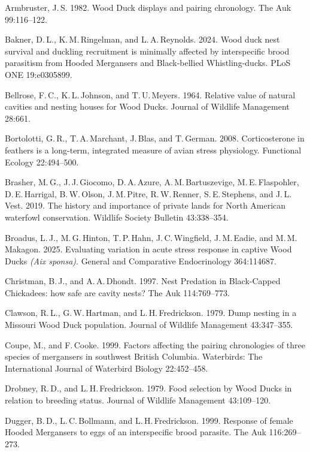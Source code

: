 
\begin{hangparas}{2em}{1}
	
	Armbruster, J.\,S. 1982. Wood Duck displays and pairing chronology. The Auk 99:116–122. 
	
	Bakner, D.\,L., K.\,M.\,Ringelman, and L.\,A.\,Reynolds. 2024. Wood duck nest survival and duckling recruitment is minimally affected by interspecific brood parasitism from Hooded Mergansers and Black-bellied Whistling-ducks. PLoS ONE 19:e0305899. 
	
	Bellrose, F.\,C., K.\,L.\,Johnson, and T.\,U.\,Meyers. 1964. Relative value of natural cavities and nesting houses for Wood Ducks. Journal of Wildlife Management 28:661. 
	
	Bortolotti, G.\,R., T.\,A.\,Marchant, J.\,Blas, and T.\,German. 2008. Corticosterone in feathers is a long-term, integrated measure of avian stress physiology. Functional Ecology 22:494–500. 
	
	Brasher, M.\,G., J.\,J.\,Giocomo, D.\,A.\,Azure, A.\,M.\,Bartuszevige, M.\,E.\,Flaspohler, D.\,E.\,Harrigal, B.\,W.\,Olson, J.\,M.\,Pitre, R.\,W.\,Renner, S.\,E.\,Stephens, and J.\,L.\,Vest. 2019. The history and importance of private lands for North American waterfowl conservation. Wildlife Society Bulletin 43:338–354. 
	
	Broadus, L.\,J., M.\,G.\,Hinton, T.\,P.\,Hahn, J.\,C.\,Wingfield, J.\,M.\,Eadie, and M.\,M.\,Makagon. 2025. Evaluating variation in acute stress response in captive Wood Ducks \textit{(Aix sponsa)}. General and Comparative Endocrinology 364:114687. 
	
	Christman, B.\,J., and A.\,A.\,Dhondt. 1997. Nest Predation in Black-Capped Chickadees: how safe are cavity nests? The Auk 114:769–773. 
	
	Clawson, R.\,L., G.\,W.\,Hartman, and L.\,H.\,Fredrickson. 1979. Dump nesting in a Missouri Wood Duck population. Journal of Wildlife Management 43:347–355. 
	
	Coupe, M., and F.\,Cooke. 1999. Factors affecting the pairing chronologies of three species of mergansers in southwest British Columbia. Waterbirds: The International Journal of Waterbird Biology 22:452–458. 
	
	Drobney, R.\,D., and L.\,H.\,Fredrickson. 1979. Food selection by Wood Ducks in relation to breeding status. Journal of Wildlife Management 43:109–120. 
	
	Dugger, B.\,D., L.\,C.\,Bollmann, and L.\,H.\,Fredrickson. 1999. Response of female Hooded Mergansers to eggs of an interspecific brood parasite. The Auk 116:269–273. 
	

\end{hangparas}
